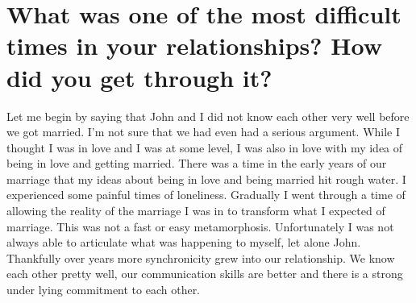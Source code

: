 \section{What was one of the most difficult times in your relationships? How did you get through it?}
Let me begin by saying that John and I did not know each other very well before we got married.
I'm not sure that we had even had a serious argument.
While I thought I was in love and I was at some level, I was also in love with my idea of being in love and getting married.
There was a time in the early years of our marriage that my ideas about being in love and being married hit rough water.
I experienced some painful times of loneliness.
Gradually I went through a time of allowing the reality of the marriage I was in to transform what I expected of marriage.
This was not a fast or easy metamorphosis.
Unfortunately I was not always able to articulate what was happening to myself, let alone John.
Thankfully over years more synchronicity grew into our relationship.
We know each other pretty well, our communication skills are better and there is a strong under lying commitment to each other.





